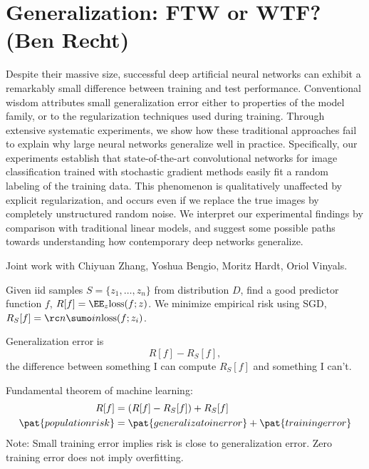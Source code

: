 \section{Generalization: FTW or WTF? (Ben Recht)}

Despite their massive size, successful deep artificial neural networks can exhibit a remarkably small difference between training and test performance. Conventional wisdom attributes small generalization error either to properties of the model family, or to the regularization techniques used during training. Through extensive systematic experiments, we show how these traditional approaches fail to explain why large neural networks generalize well in practice. Specifically, our experiments establish that state-of-the-art convolutional networks for image classification trained with stochastic gradient methods easily fit a random labeling of the training data. This phenomenon is qualitatively unaffected by explicit regularization, and occurs even if we replace the true images by completely unstructured random noise. We interpret our experimental findings by comparison with traditional linear models, and suggest some possible paths towards understanding how contemporary deep networks generalize.


Joint work with Chiyuan Zhang, Yoshua Bengio, Moritz Hardt, Oriol Vinyals.





Given iid samples $S=\{z_1,\ldots, z_n\}$ from distribution $D$, find a good predictor function $f$, $R[f] = \EE_z\text{loss}(f;z)$. We minimize empirical risk using SGD, $R_S[f] = \rc n \sumo in \text{loss}(f;z_i)$. 

Generalization error is
$$
R[f] - R_S[f],
$$
the difference between something I can compute $R_S[f]$ and something I can't.


Fundamental theorem of machine learning: %
\begin{align}
R[f] &= (R[f] - R_S[f]) + R_S[f]\\
\pat{population risk} &= \pat{generalizatoin error} + \pat{training error}
\end{align}
Note: Small training error implies risk is close to generalization error. Zero training error does not imply overfitting.

